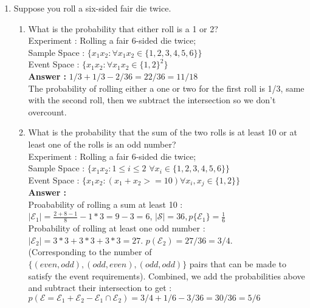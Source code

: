 \documentclass[a4paper,10pt]{article}
\newcommand{\answer}{\textbf{Answer : }}
\newcommand{\E}{\mathcal{E}}
\begin{document}
\begin{enumerate} 


\item Suppose you roll a six-sided fair die twice.
    \begin{enumerate}
    \item What is the probability that either roll is a 1 or 2? \\
    Experiment   : Rolling a fair 6-sided die twice; \\
    Sample Space : $\{x_1x_2 : \forall x_1x_2 \in \{1, 2, 3, 4, 5, 6\} \}$ \\
    Event Space  : $\{x_1x_2 : \forall x_1x_2 \in \{1, 2\}^2 \}$ \\
    \answer $ 1/3+1/3-2/36 = 22/36 = 11/18 $\\
    The probability of rolling either a one or two for the first roll is 1/3, same with the second roll, then we subtract the intersection so we don't overcount.

    \item What is the probability that the sum of the two rolls is at least 10 or at least one of the rolls is an odd number? \\
    Experiment   : Rolling a fair 6-sided die twice; \\
    Sample Space : $\{x_1x_2 : 1 \leq i \leq 2$  $\forall x_i \in \{1, 2, 3, 4, 5, 6\} \}$ \\
    Event Space  : $\{x_1x_2 : (x_1+x_2 >= 10) \forall x_i,x_j \in \{1, 2\} \}$ \\
    \answer \\
    Proabability of rolling a sum at least 10 : \\
    $|\E_1| = \frac{2+8-1}{8} - 1*3 = 9-3 = 6$, $|\mathcal{S}| = 36, p\{\mathcal{E_1}\} = \frac{1}{6}$ \\
    Probability of rolling at least one odd number : \\
    $|\E_2| = 3*3 + 3*3 + 3*3 = 27$. \quad $p(\E_2) = 27/36 = 3/4.$ \\ (Corresponding to the number of $\{(even, odd), (odd, even), (odd, odd)\}$ pairs that can be made to satisfy the event requirements).
    Combined, we add the probabilities above and subtract their intersection to get : \quad \\
     $ p(\E = \E_1+\E_2 - \E_1 \cap \E_2) = 3/4 + 1/6 - 3/36= 30/36 = 5/6$ 


\end{enumerate}
\end{enumerate}
\end{document}
